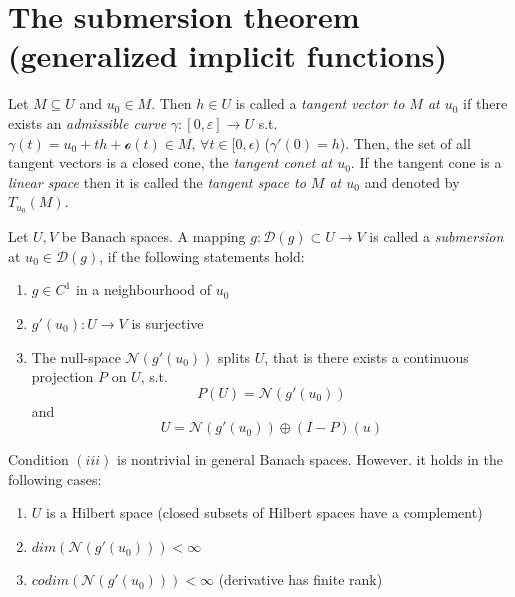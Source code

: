 \section*{The submersion theorem (generalized implicit functions)}
\begin{definition}\label{definition_1.27}
	Let $M\subseteq U$ and $u_0\in M$. Then $h\in U$ is called a \emph{tangent vector to $M$ at $u_0$} if there exists an \emph{admissible curve} $\gamma:[0,\varepsilon]\to U$ s.t. $\gamma(t) = u_0 + th + \mathcal{o}(t)\in M,\,\forall t\in[0,\epsilon)$ ($\gamma'(0) = h$). Then, the set of all tangent vectors is a closed cone, the \emph{tangent conet at $u_0$}. If the tangent cone is a \emph{linear space} then it is called the \emph{tangent space to $M$ at $u_0$} and denoted by $T_{u_0}(M)$. 
\end{definition}
\begin{definition}[Submersion]\label{definition_1.28}
	Let $U,V$ be Banach spaces. A mapping $g:\mathcal{D}(g)\subset U\to V$ is called a \emph{submersion} at $u_0\in\mathcal{D}(g)$, if the following statements hold:
	\begin{enumerate}
		\item $g\in C^1$ in a neighbourhood of $u_0$
		\item $g'(u_0):U\to V$ is surjective
		\item The null-space $\mathcal{N}(g'(u_0))$ splits $U$, that is there exists a continuous projection $P$ on $U$, s.t.
				\[
					P(U) = \mathcal{N}(g'(u_0))
				\]
				and
				\[
					U = \mathcal{N}(g'(u_0)) \oplus (I-P)(u)
				\]
	\end{enumerate}
\end{definition}

\begin{remark}
	Condition $(iii)$ is nontrivial in general Banach spaces. However. it holds in the following cases:
	\begin{enumerate}
		\item $U$ is a Hilbert space (closed subsets of Hilbert spaces have a complement)
		\item $dim(\mathcal{N}(g'(u_0))) < \infty$
		\item $codim(\mathcal{N}(g'(u_0))) < \infty$ (derivative has finite rank)
	\end{enumerate}

\end{remark}

